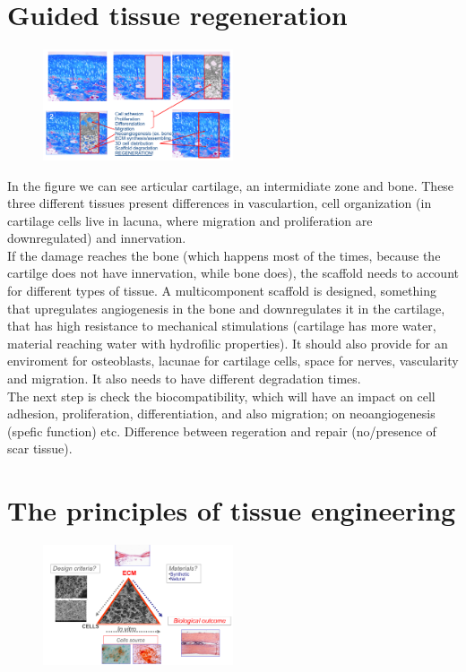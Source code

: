 \section{Guided tissue regeneration}
\begin{figure}[ht]
\centering
\includegraphics[width=0.5\textwidth]{cartilage.png}
\caption{\label{fig:cartilage}}
\end{figure}
In the figure we can see articular cartilage, an intermidiate zone and bone. These three different tissues present differences in vasculartion, cell organization (in cartilage cells live in lacuna, where migration and proliferation are downregulated) and innervation.
\\
If the damage reaches the bone (which happens most of the times, because the cartilge does not have innervation, while bone does), the scaffold needs to account for different types of tissue. A multicomponent scaffold is designed, something that upregulates angiogenesis in the bone and downregulates it in the cartilage, that has high resistance to mechanical stimulations (cartilage has more water, material reaching water with hydrofilic properties). It should also provide for an enviroment for osteoblasts, lacunae for cartilage cells, space for nerves, vascularity and migration. It also needs to have different degradation times.
\\
The next step is check the biocompatibility, which will have an impact on cell adhesion, proliferation, differentiation, and also migration; on neoangiogenesis (spefic function) etc. Difference between regeration and repair (no/presence of scar tissue).

\section{The principles of tissue engineering}
\begin{figure}[ht]
\centering
\includegraphics[width=0.5\textwidth]{triangolo.png}
\caption{\label{fig:triangle}}
\end{figure}

